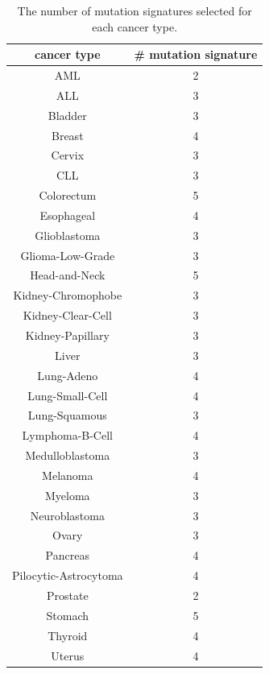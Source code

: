 \documentclass{article}
\begin{document}
\begin{table}
\caption{The number of mutation signatures selected for each cancer type.
}
\begin{center}
\begin{tabular}{|c|c|} \hline
cancer type & \# mutation signature \\ \hline
AML & 2 \\ \hline
ALL & 3 \\ \hline
Bladder & 3 \\ \hline
Breast & 4 \\ \hline
Cervix & 3 \\ \hline
CLL & 3 \\ \hline
Colorectum & 5 \\ \hline
Esophageal & 4 \\ \hline
Glioblastoma & 3 \\ \hline
Glioma-Low-Grade & 3 \\ \hline
Head-and-Neck & 5 \\ \hline
Kidney-Chromophobe & 3 \\ \hline
Kidney-Clear-Cell & 3 \\ \hline
Kidney-Papillary & 3 \\ \hline
Liver & 3 \\ \hline
Lung-Adeno & 4 \\ \hline
Lung-Small-Cell & 4 \\ \hline
Lung-Squamous & 3 \\ \hline
Lymphoma-B-Cell & 4 \\ \hline
Medulloblastoma & 3 \\ \hline
Melanoma & 4 \\ \hline
Myeloma & 3 \\ \hline
Neuroblastoma & 3 \\ \hline
Ovary & 3 \\ \hline
Pancreas & 4 \\ \hline
Pilocytic-Astrocytoma & 4 \\ \hline
Prostate & 2 \\ \hline
Stomach & 5 \\ \hline
Thyroid & 4 \\ \hline
Uterus & 4 \\ \hline
\end{tabular}
\end{center}
\label{tab_rep}
\end{table}

\clearpage
\end{document}
